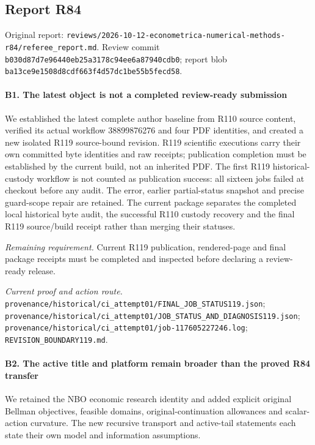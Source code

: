 \subsection{Report R84}

Original report: \nolinkurl{reviews/2026-10-12-econometrica-numerical-methods-r84/referee_report.md}. Review commit \nolinkurl{b030d87d7e96440eb25a3178c94ee6a87940cdb0}; report blob \nolinkurl{ba13ce9e1508d8cdf663f4d57dc1be55b5fecd58}.

\paragraph{B1. The latest object is not a completed review-ready submission}

We established the latest complete author baseline from R110 source content, verified its actual workflow 38899876276 and four PDF identities, and created a new isolated R119 source-bound revision. R119 scientific executions carry their own committed byte identities and raw receipts; publication completion must be established by the current build, not an inherited PDF. The first R119 historical-custody workflow is not counted as publication success: all sixteen jobs failed at checkout before any audit. The error, earlier partial-status snapshot and precise guard-scope repair are retained. The current package separates the completed local historical byte audit, the successful R110 custody recovery and the final R119 source/\allowbreak{}build receipt rather than merging their statuses.

\par\emph{Remaining requirement.} Current R119 publication, rendered-page and final package receipts must be completed and inspected before declaring a review-ready release.

\par\emph{Current proof and action route.} \nolinkurl{provenance/historical/ci_attempt01/FINAL_JOB_STATUS119.json}; \nolinkurl{provenance/historical/ci_attempt01/JOB_STATUS_AND_DIAGNOSIS119.json}; \nolinkurl{provenance/historical/ci_attempt01/job-117605227246.log}; \nolinkurl{REVISION_BOUNDARY119.md}.

\paragraph{B2. The active title and platform remain broader than the proved R84 transfer}

We retained the NBO economic research identity and added explicit original Bellman objectives, feasible domains, original-continuation allowances and scalar-action curvature. The new recursive transport and active-tail statements each state their own model and information assumptions.

